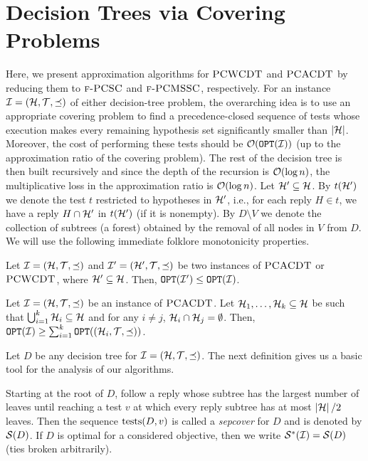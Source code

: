 \section{Decision Trees via Covering Problems} \label{sec:AL}
Here, we present approximation algorithms for $\textup{\textsc{PCWCDT}}$ and $\textup{\textsc{PCACDT}}$ by reducing them to $\textup{\textsc{f-PCSC}}$ and $\textup{\textsc{f-PCMSSC}}$, respectively. For an instance $\mathcal{I}=\mathopen{}\left( \mathcal{H},\mathcal{T},\preceq \right)$ of either decision-tree problem, the overarching idea is to use an appropriate covering problem to find a precedence-closed sequence of tests whose execution makes every remaining hypothesis set significantly smaller than $\mathopen{}\left| \mathcal{H} \right|$. Moreover, the cost of performing these tests should be $\mathcal{O}\mathopen{}\left( \texttt{OPT}\mathopen{}\left( \mathcal{I} \right) \right)$ (up to the approximation ratio of the covering problem). The rest of the decision tree is then built recursively and since the depth of the recursion is $\mathcal{O}\mathopen{}\left( \log n \right)$, the multiplicative loss in the approximation ratio is $\mathcal{O}\mathopen{}\left( \log n \right)$.
Let $\mathcal{H}'\subseteq \mathcal{H}$. By $t\mathopen{}\left( \mathcal{H}' \right)$ we denote the test $t$ restricted to hypotheses in $\mathcal{H}'$, i.e., for each reply $H\in t$, we have a reply $H\cap \mathcal{H}'$ in $t\mathopen{}\left( \mathcal{H}' \right)$ (if it is nonempty). By $D\setminus V$ we denote the collection of subtrees (a forest) obtained by the removal of all nodes in $V$ from $D$.
We will use the following immediate folklore monotonicity properties. 
\begin{lemma}\label{lemma:subspace_opt}
    Let $\mathcal{I}=\mathopen{}\left( \mathcal{H}, \mathcal{T},\preceq \right)$ and $\mathcal{I}'=\mathopen{}\left( \mathcal{H}', \mathcal{T}, \preceq \right)$ be two instances of $\textup{\textsc{PCACDT}}$ or $\textup{\textsc{PCWCDT}}$, where $\mathcal{H}'\subseteq \mathcal{H}$.
    Then, $\texttt{OPT}\mathopen{}\left( \mathcal{I}' \right) \leq \texttt{OPT}\mathopen{}\left( \mathcal{I} \right)$.
\end{lemma}
\begin{lemma}\label{lemma:subinstances_avg}
    Let $\mathcal{I}=(\mathcal{H}, \mathcal{T}, \preceq)$ be an instance of $\textup{\textsc{PCACDT}}$.
    Let $\mathcal{H}_1,\dots,\mathcal{H}_k\subseteq \mathcal{H}$ be such that $\bigcup_{i=1}^k \mathcal{H}_i \subseteq \mathcal{H}$ and for any $i\neq j$, $\mathcal{H}_i\cap \mathcal{H}_j = \emptyset$.
    Then, $\texttt{OPT}\mathopen{}\left( \mathcal{I} \right) \geq \sum_{i=1}^k \texttt{OPT}\mathopen{}\left( \mathopen{}\left( \mathcal{H}_i, \mathcal{T}, \preceq \right) \right)$.
\end{lemma}

Let $D$ be any decision tree for $\mathcal{I}=\mathopen{}\left( \mathcal{H}, \mathcal{T}, \preceq \right)$. The next definition gives us a basic tool for the analysis of our algorithms.
\begin{definition}[Sepcover]
  Starting at the root of $D$, follow a reply whose subtree has the largest number of leaves until reaching a test $v$ at which every reply subtree has at most $\mathopen{}\left| \mathcal{H} \right|/2$ leaves.
  Then the sequence $\operatorname{tests}(D,v)$ is called a \emph{sepcover} for $D$ and is denoted by $\mathcal{S}\mathopen{}\left( D \right)$.
  If $D$ is optimal for a considered objective, then we write $\mathcal{S}^*\mathopen{}\left( \mathcal{I} \right) = \mathcal{S}\mathopen{}\left( D \right)$ (ties broken arbitrarily).
\end{definition}


